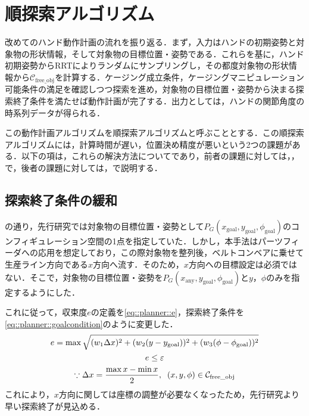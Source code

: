 \documentclass[a4paper,twoside,12pt,papersize, dvipdfmx]{iirthesis}
\begin{document}

\section{順探索アルゴリズム}\label{sec::planner::straight}
改めてのハンド動作計画の流れを振り返る．まず，入力はハンドの初期姿勢と対象物の形状情報，そして対象物の目標位置・姿勢である．これらを基に，ハンド初期姿勢からRRTによりランダムにサンプリングし，その都度対象物の形状情報から$\mathcal{C}_{\mathrm{free\_obj}}$を計算する．ケージング成立条件，ケージングマニピュレーション可能条件の満足を確認しつつ探索を進め，対象物の目標位置・姿勢から決まる探索終了条件を満たせば動作計画が完了する．出力としては，ハンドの関節角度の時系列データが得られる．\par
この動作計画アルゴリズムを順探索アルゴリズムと呼ぶこととする．この順探索アルゴリズムには，計算時間が遅い，位置決め精度が悪いという2つの課題がある．以下の項は，これらの解決方法についてであり，前者の課題に対しては，，で，後者の課題に対しては，で説明する．

\subsection{探索終了条件の緩和}\label{subsec::planner::goalcond}
の通り，先行研究では対象物の目標位置・姿勢として$P_G (x_{\mathrm {goal}}, y_{\mathrm {goal}}, \phi_{\mathrm {goal}})$のコンフィギュレーション空間の1点を指定していた．しかし，本手法はパーツフィーダへの応用を想定しており，この際対象物を整列後，ベルトコンベアに乗せて生産ライン方向である$x$方向へ流す．そのため，$x$方向への目標設定は必須ではない．そこで，対象物の目標位置・姿勢を$P_G (x_{\mathrm {any}}, y_{\mathrm {goal}}, \phi_{\mathrm {goal}})$と$y$，$\phi$のみを指定するようにした．\par
これに従って，収束度$e$の定義を\eqref{eq::planner::e}，探索終了条件を\eqref{eq::planner::goalcondition}のように変更した．
\begin{gather}
e = \max \sqrt{(w_1\Delta x)^2 + (w_2(y-y_{\mathrm{goal}}))^2 + (w_3(\phi-\phi_{\mathrm{goal}}))^2} \label{eq::planner::e} \\
e \leq \varepsilon \label{eq::planner::goalcondition} \\
\because  \Delta x = \dfrac{\max x  - \min x}{2} ,\;\; (x, y, \phi) \in \mathcal{C}_{\mathrm{free\_obj}} \notag
\end{gather}
これにより，$x$方向に関しては座標の調整が必要なくなったため，先行研究より早い探索終了が見込める．
\end{document}
